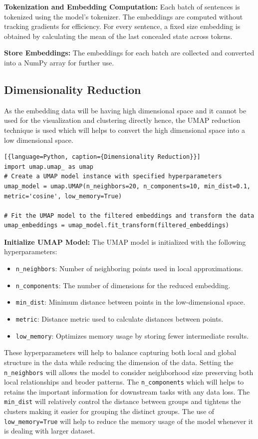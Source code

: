 \noindent\textbf{Tokenization and Embedding Computation:} Each batch of sentences is tokenized using the model’s tokenizer. 
The embeddings are computed without tracking gradients for efficiency. For every sentence, a fixed size embedding is 
obtained by calculating the mean of the last concealed state across tokens.

\noindent\textbf{Store Embeddings:} The embeddings for each batch are collected and converted into a NumPy array for further use.


\subsection{Dimensionality Reduction}

As the embedding data will be having high dimensional space and it cannot be used for the visualization and clustering directly hence, the UMAP reduction
technique is used which will helps to convert the high dimensional space into a low dimensional space.

\begin{lstlisting}[{language=Python, caption={Dimensionality Reduction}}]
import umap.umap_ as umap
# Create a UMAP model instance with specified hyperparameters
umap_model = umap.UMAP(n_neighbors=20, n_components=10, min_dist=0.1, metric='cosine', low_memory=True)

# Fit the UMAP model to the filtered embeddings and transform the data
umap_embeddings = umap_model.fit_transform(filtered_embeddings)
\end{lstlisting}

\noindent\textbf{Initialize UMAP Model:} The UMAP model is initialized with the following hyperparameters:
\begin{itemize}
    \item \texttt{n\_neighbors}: Number of neighboring points used in local approximations.
    \item \texttt{n\_components}: The number of dimensions for the reduced embedding.
    \item \texttt{min\_dist}: Minimum distance between points in the low-dimensional space.
    \item \texttt{metric}: Distance metric used to calculate distances between points.
    \item \texttt{low\_memory}: Optimizes memory usage by storing fewer intermediate results.
\end{itemize}
These hyperparameters will help to balance capturing both local and  global structure in the data while reducing the dimension of the data. Setting the \texttt{n\_neighbors}
will allows the model to consider neighborhood size preserving both local relationships and broder patterns. The \texttt{n\_components} which will helps to retains the 
important information for downstream tasks with any data loss. The \texttt{min\_dist} will relatively control the distance between groups and tightens the clusters making it easier for 
grouping the distinct groups. The use of \texttt{low\_memory=True} will help to reduce the memory usage of the model whenever it is dealing with larger dataset.

